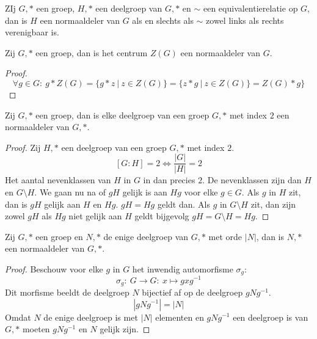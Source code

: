 \documentclass[main.tex]{subfiles}
\begin{document}
\begin{st}
  ZIj $G,*$ een groep, $H,*$ een deelgroep van $G,*$ en $\sim$ een equivalentierelatie op $G$, dan is $H$ een normaaldeler van $G$ als en slechts als $\sim$ zowel links als rechts verenigbaar is.

\end{st}

\begin{pr}
  Zij $G,*$ een groep, dan is het centrum $Z(G)$ een normaaldeler van $G$.
  \begin{proof}
    \[ \forall g\in G:\ g*Z(G) = \{ g*z \ |\ z\in Z(G) \} = \{ z*g \ |\ z\in Z(G) \} = Z(G)*g \} \]
  \end{proof}
\end{pr}

\begin{pr}
  \examen
  Zij $G,*$ een groep, dan is elke deelgroep van een groep $G,*$ met index $2$ een normaaldeler van $G,*$.
  \begin{proof}
    Zij $H,*$ een deelgroep van een groep $G,*$ met index $2$.
    \[ [G:H] = 2 \Leftrightarrow \frac{|G|}{|H|} = 2 \]
    Het aantal nevenklassen van $H$ in $G$ in dan precies $2$.
    De nevenklassen zijn dan $H$ en $G\setminus H$.
    We gaan nu na of $gH$ gelijk is aan $Hg$ voor elke $g\in G$.
    Als $g$ in $H$ zit, dan is $gH$ gelijk aan $H$ en $Hg$. $gH=Hg$ geldt dan.
    Als $g$ in $G\setminus H$ zit, dan zijn zowel $gH$ als $Hg$ niet gelijk aan $H$ geldt bijgevolg $gH = G\setminus H = Hg$.
  \end{proof}
\end{pr}

\begin{pr}
  Zij $G,*$ een groep en $N,*$ de enige deelgroep van $G,*$ met orde $|N|$, dan is $N,*$ een normaaldeler van $G,*$.

  \begin{proof}
    Beschouw voor elke $g$ in $G$ het inwendig automorfisme $\sigma_{g}$:
    \[ \sigma_{g}:\ G \rightarrow G:\ x \mapsto gxg^{-1} \]
    Dit morfisme beeldt de deelgroep $N$ bijectief af op de deelgroep $gNg^{-1}$.
    \[ |gNg^{-1}| = |N| \]
    Omdat $N$ de enige deelgroep is met $|N|$ elementen en $gNg^{-1}$ een deelgroep is van $G,*$ moeten $gNg^{-1}$ en $N$ gelijk zijn.
  \end{proof}
\end{pr}
\end{document}
